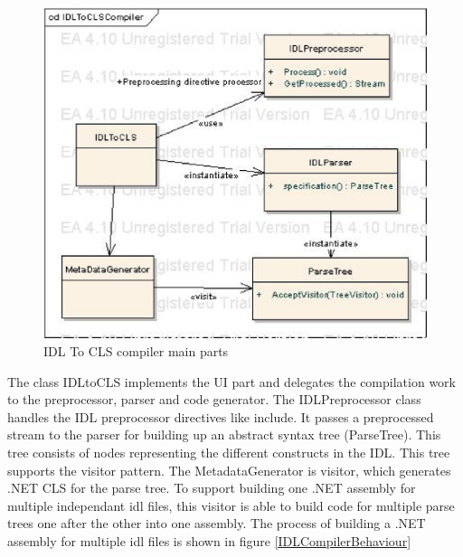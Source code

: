 \documentclass[a4paper]{report}
\begin{document}
\begin{figure}[h]
\begin{center}
\includegraphics[width=440pt]{IdlCompilerLogical.eps}
\end{center}
\caption{\label{IDLcompilerParts} IDL To CLS compiler main parts}
\end{figure}

The class IDLtoCLS implements the UI part and delegates the compilation work to the preprocessor, parser and code generator.
The IDLPreprocessor class handles the IDL preprocessor directives like include. It passes a preprocessed stream
to the parser for building up an abstract syntax tree (ParseTree). This tree consists of nodes representing the different
constructs in the IDL. This tree supports the visitor pattern. 
The MetadataGenerator is visitor, which generates .NET CLS for the parse tree.
To support building one .NET assembly for multiple independant idl files, this visitor is able
to build code for multiple parse trees one after the other into one assembly.
The process of building a .NET assembly for multiple idl files is shown in figure \ref{IDLCompilerBehaviour}
\end{document}
